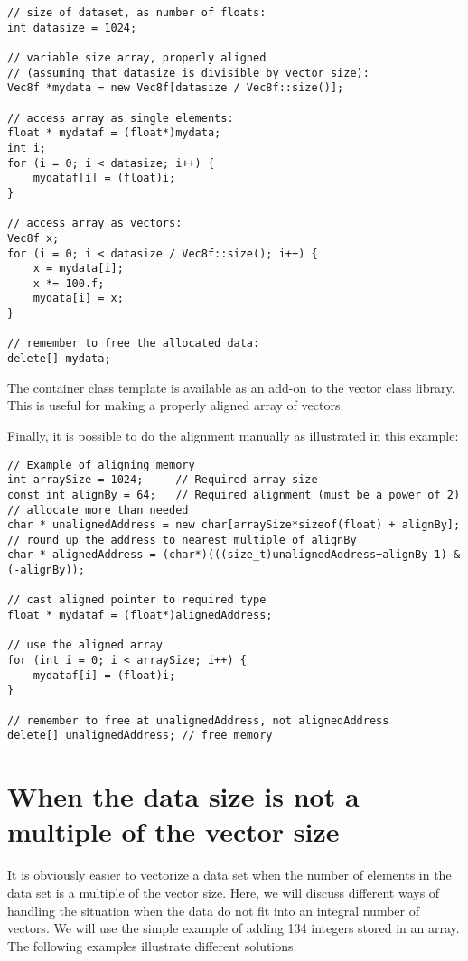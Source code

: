 \documentclass[vcl_manual.tex]{subfiles}
\begin{document}
\begin{lstlisting}[frame=none]
// size of dataset, as number of floats:
int datasize = 1024;

// variable size array, properly aligned
// (assuming that datasize is divisible by vector size):
Vec8f *mydata = new Vec8f[datasize / Vec8f::size()];

// access array as single elements:
float * mydataf = (float*)mydata;
int i;
for (i = 0; i < datasize; i++) {
    mydataf[i] = (float)i;
}

// access array as vectors:
Vec8f x;
for (i = 0; i < datasize / Vec8f::size(); i++) {
    x = mydata[i];
    x *= 100.f;
    mydata[i] = x;
}

// remember to free the allocated data:
delete[] mydata;
\end{lstlisting}

The container class template  is available as an add-on to the vector class library. This is useful for making a properly aligned array of vectors.

Finally, it is possible to do the alignment manually as illustrated in this example:

\begin{lstlisting}[frame=none]
// Example of aligning memory
int arraySize = 1024;     // Required array size
const int alignBy = 64;   // Required alignment (must be a power of 2)
// allocate more than needed
char * unalignedAddress = new char[arraySize*sizeof(float) + alignBy];
// round up the address to nearest multiple of alignBy
char * alignedAddress = (char*)(((size_t)unalignedAddress+alignBy-1) & (-alignBy));

// cast aligned pointer to required type
float * mydataf = (float*)alignedAddress;

// use the aligned array
for (int i = 0; i < arraySize; i++) {
    mydataf[i] = (float)i;
}

// remember to free at unalignedAddress, not alignedAddress
delete[] unalignedAddress; // free memory

\end{lstlisting}



\section{When the data size is not a multiple of the vector size}\label{NotAMultipleOfVectorSize}

It is obviously easier to vectorize a data set when the number of elements in the data set is a multiple of the vector size. Here, we will discuss different ways of handling the situation when the data do not fit into an integral number of vectors. We will use the simple example of adding 134 integers stored in an array. The following examples illustrate different solutions.
\end{document}
